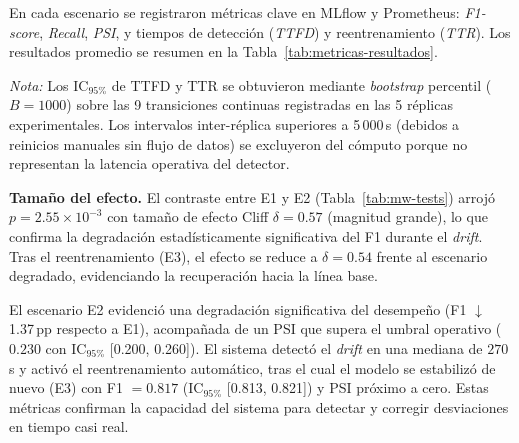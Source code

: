 En cada escenario se registraron métricas clave en MLflow y Prometheus: \textit{F1-score}, \textit{Recall}, \textit{PSI}, y tiempos de detección (\textit{TTFD}) y reentrenamiento (\textit{TTR}). Los resultados promedio se resumen en la Tabla~\ref{tab:metricas-resultados}.

\begin{table}[H]
\centering
\caption{Resumen comparativo de métricas por escenario experimental.}
\label{tab:metricas-resultados}
\small
{}
\end{table}

\noindent\footnotesize\emph{Nota:} Los IC$_{95\%}$ de TTFD y TTR se obtuvieron mediante \textit{bootstrap} percentil ($B=1000$) sobre las 9 transiciones continuas registradas en las 5 réplicas experimentales. Los intervalos inter-réplica superiores a 5\,000\,s (debidos a reinicios manuales sin flujo de datos) se excluyeron del cómputo porque no representan la latencia operativa del detector.

\noindent\textbf{Tamaño del efecto.} El contraste entre E1 y E2 (Tabla~\ref{tab:mw-tests}) arrojó $p=2.55\times10^{-3}$ con tamaño de efecto Cliff $\delta=0.57$ (magnitud grande), lo que confirma la degradación estadísticamente significativa del F1 durante el \textit{drift}. Tras el reentrenamiento (E3), el efecto se reduce a $\delta=0.54$ frente al escenario degradado, evidenciando la recuperación hacia la línea base.

El escenario E2 evidenció una degradación significativa del desempeño (F1 $\downarrow$ 1.37\,pp respecto a E1), acompañada de un PSI que supera el umbral operativo ($0.230$ con IC$_{95\%}$ [0.200, 0.260]). El sistema detectó el \textit{drift} en una mediana de $270$\,s y activó el reentrenamiento automático, tras el cual el modelo se estabilizó de nuevo (E3) con F1 $=0.817$ (IC$_{95\%}$ [0.813, 0.821]) y PSI próximo a cero. Estas métricas confirman la capacidad del sistema para detectar y corregir desviaciones en tiempo casi real.

